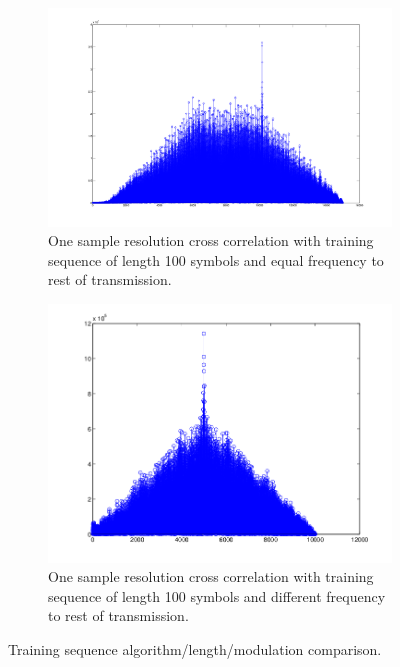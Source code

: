 \documentclass[12pt,a4paper,openright]{report}
\begin{document}
\begin{figure}[H]
\begin{subfigure}[b]{0.5\linewidth}
    \label{fig7:b} 
    \vspace{4ex}
  \end{subfigure} 
  \quad
  \begin{subfigure}[b]{0.5\linewidth}
    \centering
    \includegraphics[width=1\linewidth]{100eq.png} 
    \caption{One sample resolution cross correlation with training sequence of length 100 symbols and equal frequency to rest of transmission.} 
    \label{fig7:c} 
  \end{subfigure}%
  \quad
  \begin{subfigure}[b]{0.5\linewidth}
    \centering
    \includegraphics[width=1\linewidth]{100dif.png} 
    \caption{One sample resolution cross correlation with training sequence of length 100 symbols and different frequency to rest of transmission.} 
    \label{fig7:d} 
  \end{subfigure} 
  \caption[Training sequence algorithm/length/modulation comparison]{Training sequence algorithm/length/modulation comparison.}
  \label{fig:tscomp} 
\end{figure}
\end{document}
